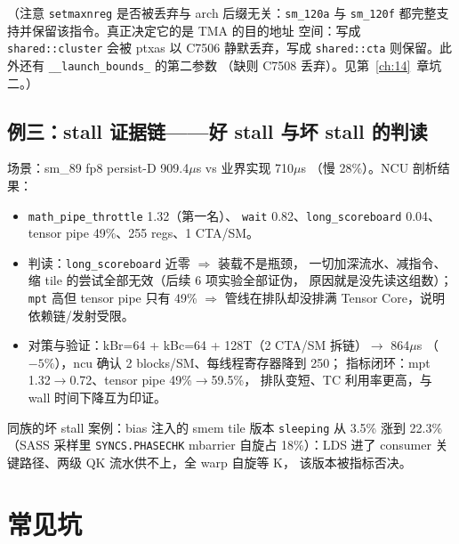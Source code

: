 （注意 \texttt{setmaxnreg} 是否被丢弃与 arch 后缀无关：\texttt{sm\_120a} 与
\texttt{sm\_120f} 都完整支持并保留该指令。真正决定它的是 TMA 的目的地址
空间：写成 \texttt{shared::cluster} 会被 ptxas 以 C7506 静默丢弃，写成
\texttt{shared::cta} 则保留。此外还有
\texttt{\_\allowbreak{}\_\allowbreak{}launch\_\allowbreak{}bounds\_\allowbreak{}} 的第二参数
（缺则 C7508 丢弃）。见第~\ref{ch:14}~章坑二。）

\subsection{例三：stall 证据链——好 stall 与坏 stall 的判读}

场景：sm\_89 fp8 persist-D 909.4$\mu$s vs 业界实现 710$\mu$s
（慢 28\%）。NCU 剖析结果：

\begin{itemize}
\item \texttt{math\_\allowbreak{}pipe\_\allowbreak{}throttle} 1.32（第一名）、
  \texttt{wait} 0.82、\texttt{long\_\allowbreak{}scoreboard} 0.04、tensor
  pipe 49\%、255 regs、1 CTA/SM。
\item 判读：\texttt{long\_\allowbreak{}scoreboard} 近零 $\Rightarrow$ 装载不是瓶颈，
  一切加深流水、减指令、缩 tile 的尝试全部无效（后续 6 项实验全部证伪，
  原因就是没先读这组数）；\texttt{mpt} 高但 tensor pipe 只有 49\% $\Rightarrow$
  管线在排队却没排满 Tensor Core，说明依赖链/发射受限。
\item 对策与验证：kBr=64 + kBc=64 + 128T（2 CTA/SM 拆链）$\to$ 864$\mu$s
  （$-5\%$），ncu 确认 2 blocks/SM、每线程寄存器降到 250；
  指标闭环：mpt 1.32$\to$0.72、tensor pipe 49\%$\to$59.5\%，
  排队变短、TC 利用率更高，与 wall 时间下降互为印证。
\end{itemize}

同族的坏 stall 案例：bias 注入的 smem tile 版本 \texttt{sleeping} 从
3.5\% 涨到 22.3\%（SASS 采样里 \texttt{SYNCS.\allowbreak{}PHASECHK} mbarrier 自旋占
18\%）：LDS 进了 consumer 关键路径、两级 QK 流水供不上，全 warp 自旋等 K，
该版本被指标否决。

\section{常见坑}


